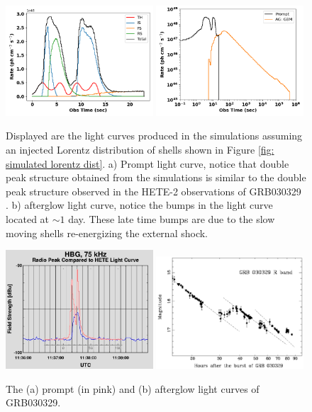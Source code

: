 \documentclass[linenumbers]{aastex631}
\begin{document}
\begin{figure}[!ht]
    \centering
    \includegraphics[width=0.49\textwidth]{figures/22-03-08-prompt.png}
    \includegraphics[width=0.49\textwidth]{figures/22-03-08-aftglow.png}
    \caption{Displayed are the light curves produced in the simulations assuming an injected Lorentz distribution of shells shown in Figure \ref{fig: simulated lorentz dist}. a) Prompt light curve, notice that double peak structure obtained from the simulations is similar to the double peak structure observed in the HETE-2 observations of GRB030329 \citep{2003GCN..1997....1V}. b) afterglow light curve, notice the bumps in the light curve located at $\sim 1$ day. These late time bumps are due to the slow moving shells re-energizing the external shock.}
    \label{fig: simulated light curves}
\end{figure}

\begin{figure}[!ht]
    \centering
    \includegraphics[width=0.49\textwidth]{figures/grb030329-prompt.jpg}
    \includegraphics[width=0.49\textwidth]{figures/GRB030329-afterglow.png}
    \caption{The (a) prompt (in pink) and (b) afterglow light curves of GRB030329.}
    \label{fig: GRB030329 light curves}
\end{figure}

\newpage


\end{document}
